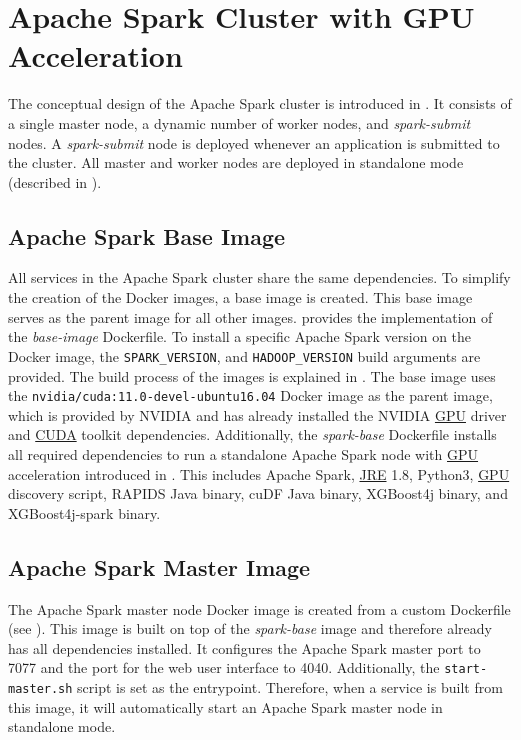 \section{Apache Spark Cluster with GPU Acceleration}
\label{sec:07_spark}
The conceptual design of the Apache Spark cluster is introduced in . It consists of a single master node, a dynamic number of worker nodes, and \textit{spark-submit} nodes. A \textit{spark-submit} node is deployed whenever an application is submitted to the cluster.
All master and worker nodes are deployed in standalone mode (described in ).


\subsection{Apache Spark Base Image}
All services in the Apache Spark cluster share the same dependencies. To simplify the creation of the Docker images, a base image is created. This base image serves as the parent image for all other images.
%
 provides the implementation of the \textit{base-image} Dockerfile.
%
To install a specific Apache Spark version on the Docker image, the \texttt{SPARK\_VERSION}, and \texttt{HADOOP\_VERSION} build arguments are provided. The build process of the images is explained in .
%
The base image uses the \texttt{nvidia/cuda:11.0-devel-ubuntu16.04} Docker image as the parent image, which is provided by NVIDIA and has already installed the NVIDIA \hyperlink{abbr:gpu}{GPU} driver and \hyperlink{abbr:cuda}{CUDA} toolkit dependencies.
%
Additionally, the \textit{spark-base} Dockerfile installs all required dependencies to run a standalone Apache Spark node with \hyperlink{abbr:gpu}{GPU} acceleration introduced in . This includes Apache Spark, \hyperlink{abbr:jre}{JRE} 1.8, Python3, \hyperlink{abbr:gpu}{GPU} discovery script, RAPIDS Java binary, cuDF Java binary, XGBoost4j binary, and XGBoost4j-spark binary.


\subsection{Apache Spark Master Image}
The Apache Spark master node Docker image is created from a custom Dockerfile (see ).
This image is built on top of the \textit{spark-base} image and therefore already has all dependencies installed.
It configures the Apache Spark master port to 7077 and the port for the web user interface to 4040.
Additionally, the \texttt{start-master.sh} script is set as the entrypoint. Therefore, when a service is built from this image, it will automatically start an Apache Spark master node in standalone mode.


